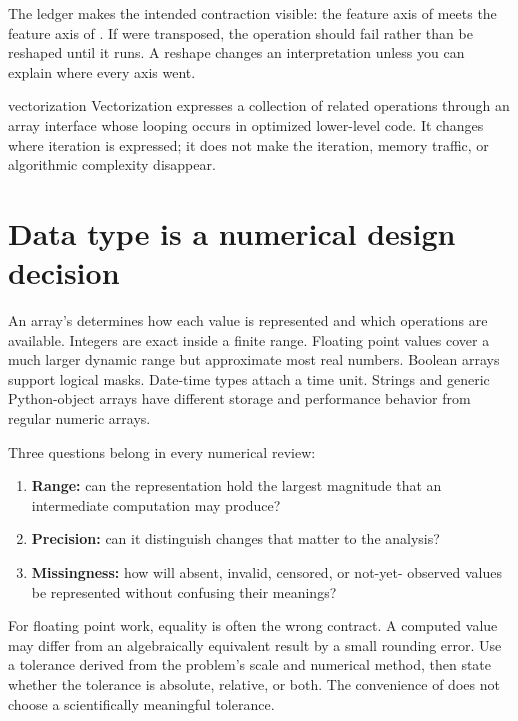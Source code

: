 The ledger makes the intended contraction visible: the feature axis of
 meets the feature axis of . If  were transposed,
the operation should fail rather than be reshaped until it runs. A reshape
changes an interpretation unless you can explain where every axis went.

\begin{definitionbox}{vectorization}
Vectorization expresses a collection of related operations through an array
interface whose looping occurs in optimized lower-level code. It changes where
iteration is expressed; it does not make the iteration, memory traffic, or
algorithmic complexity disappear.
\end{definitionbox}

\section{Data type is a numerical design decision}

An array's  determines how each value is represented and which
operations are available. Integers are exact inside a finite range. Floating
point values cover a much larger dynamic range but approximate most real
numbers. Boolean arrays support logical masks. Date-time types attach a time
unit. Strings and generic Python-object arrays have different storage and
performance behavior from regular numeric arrays.

Three questions belong in every numerical review:

\begin{enumerate}
  \item \textbf{Range:} can the representation hold the largest magnitude that
  an intermediate computation may produce?
  \item \textbf{Precision:} can it distinguish changes that matter to the
  analysis?
  \item \textbf{Missingness:} how will absent, invalid, censored, or not-yet-
  observed values be represented without confusing their meanings?
\end{enumerate}

For floating point work, equality is often the wrong contract. A computed value
may differ from an algebraically equivalent result by a small rounding error.
Use a tolerance derived from the problem's scale and numerical method, then
state whether the tolerance is absolute, relative, or both. The convenience of
 does not choose a scientifically meaningful tolerance.

